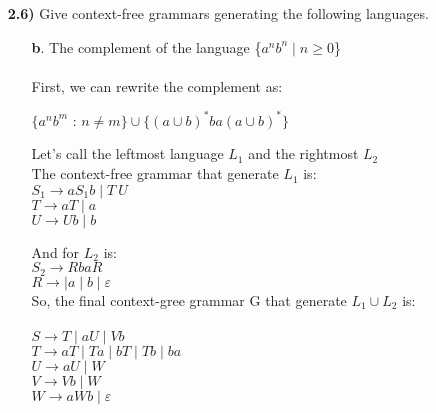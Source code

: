 \documentclass[12pt]{letter}
\begin{document}
\begin{enumerate}
\newpage
\item[\textbf{2.6)}] Give context-free grammars generating the following languages.\\
\begin{enumerate}
	\item[\textbf{b}.] The complement of the language \{$a^nb^n \mid n \geq $0\} \\
	\leavevmode \\
	First, we can rewrite the complement as: \\
	\begin{center} $\{a^nb^m$ : $ n \neq m\} \cup \{(a\cup b)^*ba(a \cup b)^*\}$\end{center}
	Let's call the leftmost language $L_1$ and the rightmost $L_2$ \\
	The context-free grammar that generate $L_1$ is: \\
	\setlength\parindent{100pt} 
	$S_1 \rightarrow aS_1b \mid T \ U$ \\
	$T \rightarrow aT \mid a$ \\
	$U \rightarrow Ub \mid b$
	\setlength\parindent{0pt} 

	And for $L_2$ is:\\
	\setlength\parindent{100pt} 
	$S_2 \rightarrow RbaR$ \\
	$R \rightarrow \mid a \mid b \mid \varepsilon$\\
	\setlength\parindent{0pt} 
	So, the final context-gree grammar G that generate $L_1 \cup L_2$ is: \\
	\leavevmode \\
	\setlength\parindent{100pt} 
	$S \rightarrow T \mid aU \mid Vb $\\
	$T \rightarrow aT \mid Ta \mid bT \mid Tb \mid ba$ \\
	$U \rightarrow aU \mid W$\\
	$V \rightarrow Vb \mid W$\\
	$W \rightarrow aWb \mid \varepsilon$\\
	\setlength\parindent{0pt} 



\end{enumerate}
\end{enumerate}
\end{document}
